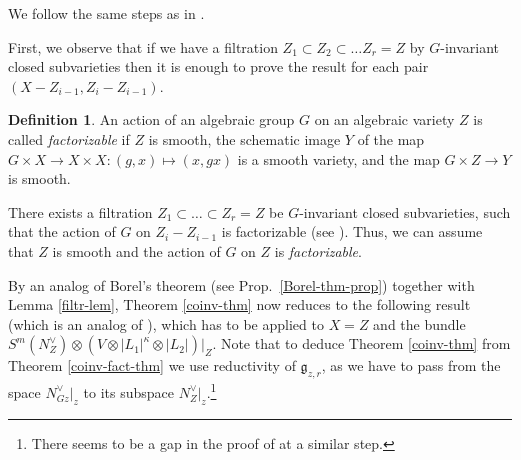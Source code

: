 \documentclass[12pt,reqno]{amsart}
\theoremstyle{definition}
\newtheorem{definition}[theorem]{Definition}
\theoremstyle{remark}
\numberwithin{equation}{section}
\newcommand{\ot}{\otimes}
\newcommand{\sub}{\subset}
\newcommand{\fg}{{\mathfrak g}}
\begin{document}
We follow the same steps as in \cite{AG-sm-tr}. 

First, we observe that if we have a filtration $Z_1\sub Z_2\sub\ldots Z_r=Z$ by $G$-invariant closed subvarieties then it is enough
to prove the result for each pair $(X-Z_{i-1},Z_i-Z_{i-1})$.

\begin{definition} An action of an algebraic group $G$ on an algebraic variety $Z$ is called {\it factorizable} if $Z$ is smooth, the schematic image $Y$ of the map 
$G\times X\to X\times X:(g,x)\mapsto (x,gx)$ is a smooth variety, and the map $G\times Z\to Y$ is smooth.
\end{definition}

There exists a filtration $Z_1\sub\ldots\sub Z_r=Z$ be $G$-invariant closed subvarieties, such that the action of $G$ on $Z_i-Z_{i-1}$ is factorizable
(see \cite[Thm.\ B.0.11]{AG-sm-tr}). 
Thus, we can assume that $Z$ is smooth and the action of $G$ on $Z$ is {\it factorizable}.

By an analog of Borel's theorem (see Prop.\ \ref{Borel-thm-prop}) together with Lemma \ref{filtr-lem},
Theorem \ref{coinv-thm} now reduces to the following result (which is an analog of \cite[Thm.\ B.0.12]{AG-sm-tr}), which has to be applied to
$X=Z$ and the bundle $S^m(N^\vee_Z)\ot (V\ot |L_1|^{\kappa}\ot |L_2|)|_Z$.
Note that to deduce Theorem \ref{coinv-thm} from Theorem \ref{coinv-fact-thm} we use reductivity of
$\fg_{z,r}$, as we have to pass from the space $N^\vee_{Gz}|_z$ to its subspace $N^{\vee}_Z|_z$.\footnote{There seems to be a gap in the proof of \cite[Thm.\ B.0.2]{AG-sm-tr} at a similar step.}
\end{document}

